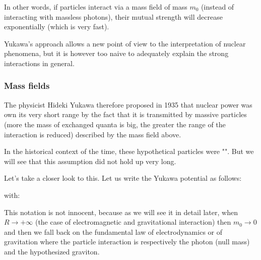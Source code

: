 	In other words, if particles interact via a mass field of mass $m_0$ (instead of interacting with massless photons), their mutual strength will decrease exponentially (which is very fast).

	Yukawa's approach allows a new point of view to the interpretation of nuclear phenomena, but it is however too naive to adequately explain the strong interactions in general.
	
	\pagebreak
	\subsubsection{Mass fields}
	The physicist Hideki Yukawa therefore proposed in 1935 that nuclear power was own its very short range by the fact that it is transmitted by massive particles (more the mass of exchanged quanta is big, the greater the range of the interaction is reduced) described by the mass field above.
	
	\begin{tcolorbox}[title=Remark,colframe=black,arc=10pt]
	In the historical context of the time, these hypothetical particles were "". But we will see that this assumption did not hold up very long.
	\end{tcolorbox}
	Let's take a closer look to this. Let us write the Yukawa potential as follows:
	
	with:
	
	This notation is not innocent, because as we will see it in detail later, when $R\rightarrow +\infty$ (the case of electromagnetic and gravitational interaction) then $m_0\rightarrow 0$ and then we fall back on the fundamental law of electrodynamics or of gravitation where the particle interaction is respectively the photon (null mass) and the hypothesized graviton.
	
